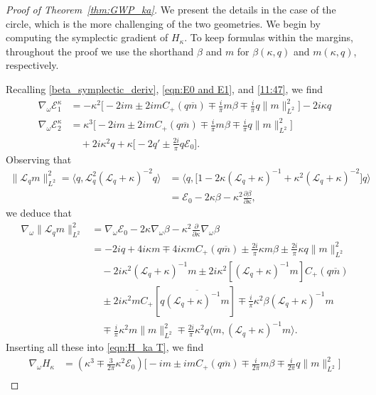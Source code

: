 \documentclass{amsart}
\numberwithin{equation}{section}
\theoremstyle{definition}
\newcommand{\om}{\omega}
\newcommand{\ka}{\kappa}
\newcommand{\E}{\mathcal{E}}
\newcommand{\Lc}{\mathcal{L}}
\newcommand{\na}{\nabla}
\newcommand{\lan}{\langle}
\newcommand{\ran}{\rangle}
\begin{document}
\begin{proof}[Proof of Theorem~\ref{thm:GWP_ka}]
We present the details in the case of the circle, which is the more challenging of the two geometries. We begin by computing the symplectic gradient of $H_\ka$.  To keep formulas within the margins, throughout the proof we use the shorthand $\beta$ and $m$ for $\beta(\ka,q)$ and $m(\ka,q)$, respectively.

Recalling \eqref{beta_symplectic_deriv}, \eqref{eqn:E0 and E1}, and \eqref{11:47}, we find
\begin{equation}\label{symplectic deriv reg E}
\begin{aligned}
\na_\om\E_1^\ka&=-\ka^2\bigl[-2im\pm 2im C_+(q\overline{m})\mp\tfrac{i}{\pi} m \beta\mp\tfrac{i}{\pi}q\|m \|^2_{L^2}\bigr] -2i\ka q\\
\na_\om\E_2^\ka&=\ka^3\bigl[-2im\pm 2im C_+(q\overline{m})\mp\tfrac{i}{\pi} m \beta\mp\tfrac{i}{\pi}q\|m \|^2_{L^2}\bigr] \\
&\quad+2i\ka^2 q +\ka\bigl[ -2q'\pm\tfrac{2i}{\pi}q\mathcal{E}_0\bigr].
\end{aligned}
\end{equation}
Observing that
\begin{align}\label{11:51}
\|\Lc_q m\|_{L^2}^2 = \langle q, \Lc_q^2 (\Lc_q+\ka)^{-2}q\rangle &=  \langle q, \bigl[1-2\ka (\Lc_q+\ka)^{-1} + \ka^2(\Lc_q+\ka)^{-2}\bigr] q\rangle\nonumber \\
&=\E_0 - 2\ka\beta-\ka^2 \tfrac{\partial\beta}{\partial\kappa},
\end{align}
we deduce that
\begin{align}
\na_\om\| \Lc_qm\|_{L^2}^2&=\na_\om\E_0 - 2\ka\na_\om\beta-\ka^2 \tfrac{\partial}{\partial\kappa}\na_\om\beta\nonumber\\
&=-2iq+4i\ka m\mp4i\ka m C_+(q\overline{m})\pm\tfrac{2i}{\pi}\ka m\beta\pm\tfrac{2i}{\pi}\ka q\|m\|^2_{L^2}\nonumber\\
&\quad-2i \ka^2(\Lc_q+\ka)^{-1}m\pm2i\ka^2[(\Lc_q+\ka)^{-1}m] C_+(q\overline{m})\nonumber\\
&\quad\pm2i\ka^2 m C_+[q\overline{(\Lc_q+\ka)^{-1}m}]\mp\tfrac{i}{\pi}\ka^2\beta (\Lc_q+\ka)^{-1}m\nonumber\\
&\quad\mp\tfrac{i}{\pi}\ka^2 m\|m\|_{L^2}^2\mp\tfrac{2i}{\pi}\ka^2 q\lan m,(\Lc_q+\ka)^{-1}m\ran.\label{eqn:na_om_Lqm}
\end{align}
Inserting all these into \eqref{eqn:H_ka T}, we find
\begin{align*}
\na_\om H_\ka&=(\ka^3\mp \tfrac3{2\pi}\ka^2\E_0)\bigl[-im\pm im C_+(q\overline{m})\mp \tfrac{i}{2\pi}m\beta \mp \tfrac{i}{2\pi}q\|m\|_{L^2}^2\bigr]\\

\end{align*}
\end{proof}
\end{document}
